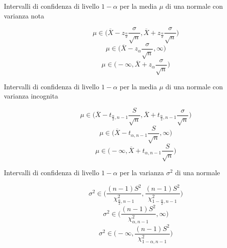 \begin{description}
	
	\item[Intervalli di confidenza di livello $1-\alpha$ per la media $\mu$ di una normale con varianza nota]
	\begin{equation}
	\mu \in \Big(\overline{X}-z_{\frac{\alpha}{2}}\frac{\sigma}{\sqrt{n}},\overline{X}+z_{\frac{\alpha}{2}}\frac{\sigma}{\sqrt{n}}\Big)
	\end{equation}
	\begin{equation}
	\mu \in \Big(\overline{X}-z_{\alpha}\frac{\sigma}{\sqrt{n}},\infty\Big)
	\end{equation}
	\begin{equation}
	\mu \in \Big(-\infty,\overline{X}+z_{\alpha}\frac{\sigma}{\sqrt{n}}\Big)
	\end{equation}
	
	\item[Intervalli di confidenza di livello $1-\alpha$ per la media $\mu$ di una normale con varianza incognita]
	\begin{equation}
	\mu \in \Big(\overline{X}-t_{\frac{\alpha}{2},n-1}\frac{S}{\sqrt{n}},\overline{X}+t_{\frac{\alpha}{2},n-1}\frac{\sigma}{\sqrt{n}}\Big)
	\end{equation}
	\begin{equation}
	\mu \in \Big(\overline{X}-t_{\alpha,n-1}\frac{S}{\sqrt{n}},\infty\Big)
	\end{equation}
	\begin{equation}
	\mu \in \Big(-\infty,\overline{X}+t_{\alpha,n-1}\frac{S}{\sqrt{n}}\Big)
	\end{equation}
	
	\item[Intervalli di confidenza di livello $1-\alpha$ per la varianza $\sigma^{2}$ di una normale]
	\begin{equation}
	\sigma^{2} \in \Big(\frac{(n-1)S^{2}}{\chi^{2}_{\frac{\alpha}{2},n-1}},\frac{(n-1)S^{2}}{\chi^{2}_{1-\frac{\alpha}{2},n-1}}\Big)
	\end{equation}
	\begin{equation}
	\sigma^{2} \in \Big(\frac{(n-1)S^{2}}{\chi^{2}_{\alpha,n-1}},\infty\Big)
	\end{equation}
	\begin{equation}
	\sigma^{2} \in \Big(-\infty,\frac{(n-1)S^{2}}{\chi^{2}_{1-\alpha,n-1}}\Big)
	\end{equation}
	

\end{description}

